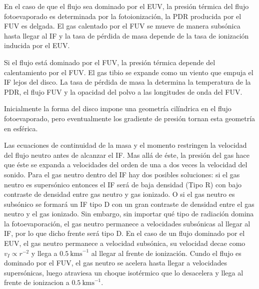 En el caso de que el flujo sea dominado por el EUV, la presión térmica del
flujo fotoevaporado es determinada por la fotoionización, la PDR producida
por el FUV es delgada. El gas calentado por el FUV se mueve de manera
subsónica hasta llegar al IF y la tasa de pérdida de masa depende de la tasa de ionización inducida por el EUV.

Si el flujo está dominado por el FUV, la presión térmica depende del
calentamiento por el FUV. El gas tibio se expande como un viento que empuja
el IF lejos del disco. La tasa de pérdida de masa la determina la temperatura
de la PDR, el flujo FUV y la opacidad del polvo a las longitudes de onda del FUV.

Inicialmente la forma del disco impone una geometría cilíndrica en el
flujo fotoevaporado, pero eventualmente los gradiente de presión tornan
esta geometría en esférica.

Las ecuaciones de continuidad de la masa y el momento restringen la velocidad
del flujo neutro antes de alcanzar el IF. Mas allá de éste, la presión del gas hace que éste se expanda a velocidades del orden de una a dos veces la velocidad del sonido. Para el gas neutro dentro del IF hay dos posibles soluciones: si el gas neutro es supersónico entonces el IF será de baja densidad (Tipo R) con bajo contraste de densidad entre gas neutro y gas ionizado. O si el gas neutro es subsónico se formará un IF tipo D con un gran contraste de densidad entre el gas neutro y el gas ionizado. Sin embargo, sin importar qué tipo de radiación domina la fotoevaporación, el gas neutro permanece a velocidades subsónicas al llegar al IF, por lo que dicho frente será tipo D. En el caso de un flujo dominado por el EUV, el gas neutro permanece a velocidad subsónica, su velocidad decae como $v_I \propto r^{-2}$ y llega a $0.5~\mathrm{kms}^{-1}$ al llegar al frente de ionización. Cundo el flujo es dominado por el FUV, el gas neutro se acelera hasta llegar a velocidades supersónicas, luego atraviesa un choque isotérmico que lo desacelera y llega al frente de ionizacion a $0.5~\mathrm{kms}^{-1}$.

